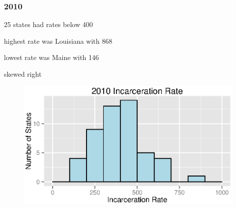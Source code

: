 \documentclass{exam}
\begin{document}
  \subsubsection{2010}
  \begin{itemize*}
    \item 25 states had rates below 400
    \item highest rate was Louisiana with 868
    \item lowest rate was Maine with 146
    \item skewed right
  \end{itemize*}
  \begin{figure}[H]
    \centering
    \includegraphics[scale = 0.9]{2010_rate_histogram.eps}
  \end{figure}
\end{document}
